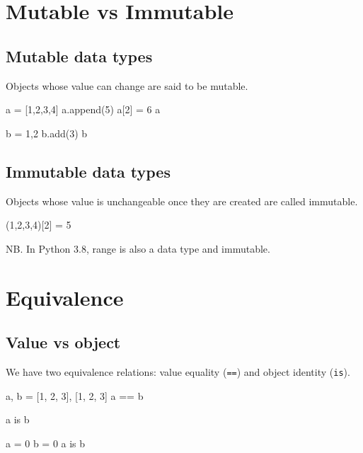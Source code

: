 \documentclass[aspectratio=1610,slidestop]{beamer}
\begin{document}
\section{Mutable vs Immutable}
\makeTableOfContentsSection

\begin{pframe}
 \begin{center}
   
 \end{center}
\end{pframe}

\subsection{Mutable data types}
\begin{pframe}
Objects whose value can change are said to be mutable.

\begin{pyconsole}
a = [1,2,3,4]
a.append(5)
a[2] = 6
a

b = {1,2}
b.add(3)
b
\end{pyconsole}
\end{pframe}

\subsection{Immutable data types}
\begin{pframe}
Objects whose value is unchangeable once they are created are called immutable.

\begin{pyconsole}
(1,2,3,4)[2] = 5
\end{pyconsole}
\medskip
\medskip
NB. In Python 3.8, range is also a data type and immutable.
\end{pframe}


\section{Equivalence}
\makeTableOfContentsSection

\subsection{Value vs object}
\begin{pframe}
We have two equivalence relations: value equality (\texttt{==}) and
object identity (\texttt{is}).
\begin{pyconsole}
a, b = [1, 2, 3], [1, 2, 3]
a == b

a is b

a = 0
b = 0
a is b

\end{pyconsole}
\end{pframe}
\end{document}
